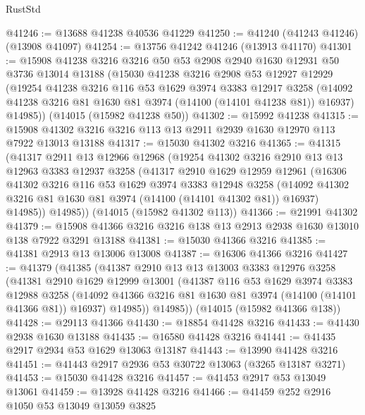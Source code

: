 \begin{lexlean}{RustStd}
\begin{coremodule}
@41246 := @13688 @41238 @40536 @41229
@41250 := @41240 (@41243 @41246) (@13908 @41097)
@41254 := @13756 @41242 @41246 (@13913 @41170)
@41301 := @15908
    @41238
    @3216
    @3216
    @50
    @53
    @2908
    @2940
    @1630
    @12931
    @50
    @3736
    @13014
    @13188
    (@15030
      @41238
      @3216
      @2908
      @53
      @12927
      @12929
      (@19254
        @41238
        @3216
        @116
        @53
        @1629
        @3974
        @3383
        @12917
        @3258
        (@14092 @41238 @3216 @81 @1630 @81 @3974 (@14100 (@14101 @41238 @81)) @16937)
        @14985))
    (@14015 (@15982 @41238 @50))
@41302 := @15992 @41238
@41315 := @15908 @41302 @3216 @3216 @113 @13 @2911 @2939 @1630 @12970 @113 @7922 @13013 @13188
@41317 := @15030 @41302 @3216
@41365 := @41315
    (@41317
      @2911
      @13
      @12966
      @12968
      (@19254
        @41302
        @3216
        @2910
        @13
        @13
        @12963
        @3383
        @12937
        @3258
        (@41317
          @2910
          @1629
          @12959
          @12961
          (@16306
            @41302
            @3216
            @116
            @53
            @1629
            @3974
            @3383
            @12948
            @3258
            (@14092 @41302 @3216 @81 @1630 @81 @3974 (@14100 (@14101 @41302 @81)) @16937)
            @14985))
        @14985))
    (@14015 (@15982 @41302 @113))
@41366 := @21991 @41302
@41379 := @15908 @41366 @3216 @3216 @138 @13 @2913 @2938 @1630 @13010 @138 @7922 @3291 @13188
@41381 := @15030 @41366 @3216
@41385 := @41381 @2913 @13 @13006 @13008
@41387 := @16306 @41366 @3216
@41427 := @41379
    (@41385
      (@41387
        @2910
        @13
        @13
        @13003
        @3383
        @12976
        @3258
        (@41381
          @2910
          @1629
          @12999
          @13001
          (@41387
            @116
            @53
            @1629
            @3974
            @3383
            @12988
            @3258
            (@14092 @41366 @3216 @81 @1630 @81 @3974 (@14100 (@14101 @41366 @81)) @16937)
            @14985))
        @14985))
    (@14015 (@15982 @41366 @138))
@41428 := @29113 @41366
@41430 := @18854 @41428 @3216
@41433 := @41430 @2938 @1630 @13188
@41435 := @16580 @41428 @3216
@41441 := @41435 @2917 @2934 @53 @1629 @13063 @13187
@41443 := @13990 @41428 @3216
@41451 := @41443 @2917 @2936 @53 @30722 @13063 (@3265 @13187 @3271)
@41453 := @15030 @41428 @3216
@41457 := @41453 @2917 @53 @13049 @13061
@41459 := @13928 @41428 @3216
@41466 := @41459 @252 @2916 @1050 @53 @13049 @13059 @3825

\end{coremodule}
\end{lexlean}
